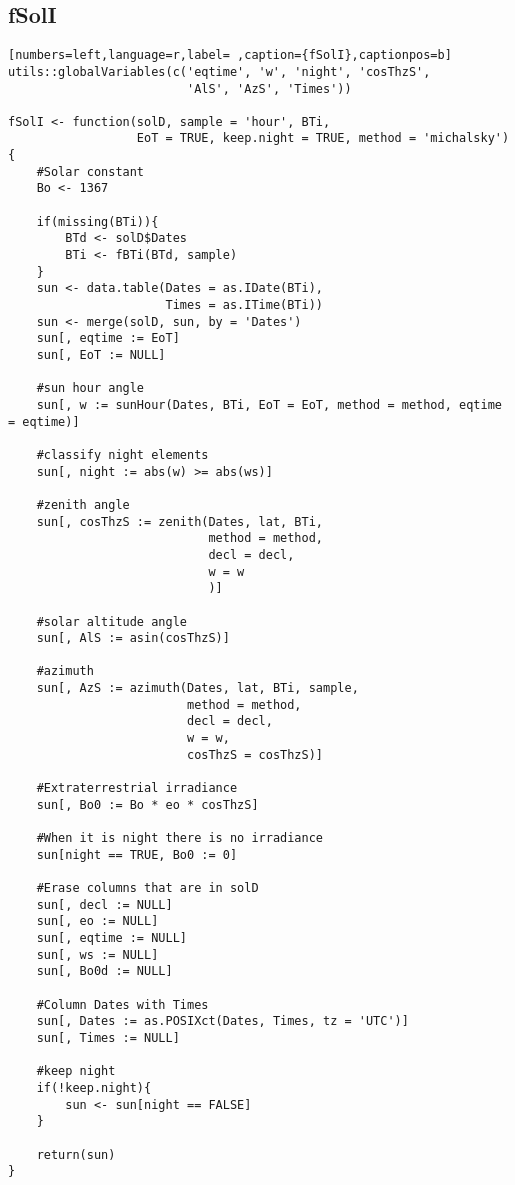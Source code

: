 \subsection{fSolI}
\label{sec:org8f26cfd}
\label{subsec:fsoli}
\begin{lstlisting}[numbers=left,language=r,label= ,caption={fSolI},captionpos=b]
utils::globalVariables(c('eqtime', 'w', 'night', 'cosThzS',
                         'AlS', 'AzS', 'Times'))

fSolI <- function(solD, sample = 'hour', BTi,
                  EoT = TRUE, keep.night = TRUE, method = 'michalsky')
{
    #Solar constant
    Bo <- 1367

    if(missing(BTi)){
        BTd <- solD$Dates
        BTi <- fBTi(BTd, sample)
    }
    sun <- data.table(Dates = as.IDate(BTi),
                      Times = as.ITime(BTi))
    sun <- merge(solD, sun, by = 'Dates')
    sun[, eqtime := EoT]
    sun[, EoT := NULL]

    #sun hour angle
    sun[, w := sunHour(Dates, BTi, EoT = EoT, method = method, eqtime = eqtime)]

    #classify night elements
    sun[, night := abs(w) >= abs(ws)]

    #zenith angle
    sun[, cosThzS := zenith(Dates, lat, BTi,
                            method = method,
                            decl = decl,
                            w = w
                            )]

    #solar altitude angle
    sun[, AlS := asin(cosThzS)]

    #azimuth
    sun[, AzS := azimuth(Dates, lat, BTi, sample,
                         method = method,
                         decl = decl, 
                         w = w,
                         cosThzS = cosThzS)]

    #Extraterrestrial irradiance
    sun[, Bo0 := Bo * eo * cosThzS]

    #When it is night there is no irradiance
    sun[night == TRUE, Bo0 := 0]

    #Erase columns that are in solD
    sun[, decl := NULL]
    sun[, eo := NULL]
    sun[, eqtime := NULL]
    sun[, ws := NULL]
    sun[, Bo0d := NULL]

    #Column Dates with Times
    sun[, Dates := as.POSIXct(Dates, Times, tz = 'UTC')]
    sun[, Times := NULL]

    #keep night
    if(!keep.night){
        sun <- sun[night == FALSE]
    }

    return(sun)
}
\end{lstlisting}
